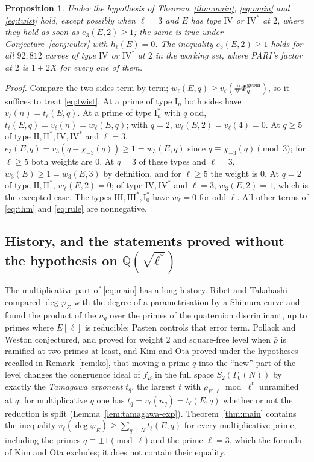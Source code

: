\documentclass[11pt]{amsart}
\newtheorem{proposition}[theorem]{Proposition}
\theoremstyle{definition}
\newcommand{\Q}{\mathbb{Q}}
\newcommand{\degphi}{\deg\varphi_E}
\newcommand{\Phig}{\Phi^{\mathrm{geom}}}
\begin{document}
\begin{proposition}\label{prop:forms}
Under the hypothesis of Theorem~\ref{thm:main}, \eqref{eq:main} and \eqref{eq:twist} hold, except possibly when $\ell=3$ and $E$ has type $\mathrm{IV}$ or $\mathrm{IV}^*$ at $2$, where they hold as soon as $e_3(E,2)\ge1$; the same is true under Conjecture~\ref{conj:euler} with $h_\ell(E)=0$. The inequality $e_3(E,2)\ge1$ holds for all $92{,}812$ curves of type $\mathrm{IV}$ or $\mathrm{IV}^*$ at $2$ in the working set, where PARI's factor at $2$ is $1+2X$ for every one of them.
\end{proposition}
\begin{proof}
Compare the two sides term by term; $w_\ell(E,q)\ge v_\ell(\#\Phig_q)$, so it suffices to treat \eqref{eq:twist}. At a prime of type $\mathrm{I}_n$ both sides have $v_\ell(n)=t_\ell(E,q)$. At a prime of type $\mathrm{I}_n^*$ with $q$ odd, $t_\ell(E,q)=v_\ell(n)=w_\ell(E,q)$; with $q=2$, $w_\ell(E,2)=v_\ell(4)=0$. At $q\ge5$ of type $\mathrm{II},\mathrm{II}^*,\mathrm{IV},\mathrm{IV}^*$ and $\ell=3$, $e_3(E,q)=v_3(q-\chi_{-3}(q))\ge1=w_3(E,q)$ since $q\equiv\chi_{-3}(q)\pmod3$; for $\ell\ge5$ both weights are $0$. At $q=3$ of these types and $\ell=3$, $w_3(E)\ge1=w_3(E,3)$ by definition, and for $\ell\ge5$ the weight is $0$. At $q=2$ of type $\mathrm{II},\mathrm{II}^*$, $w_\ell(E,2)=0$; of type $\mathrm{IV},\mathrm{IV}^*$ and $\ell=3$, $w_3(E,2)=1$, which is the excepted case. The types $\mathrm{III},\mathrm{III}^*,\mathrm{I}_0^*$ have $w_\ell=0$ for odd $\ell$. All other terms of \eqref{eq:thm} and \eqref{eq:rule} are nonnegative.
\end{proof}

\subsection{History, and the statements proved without the hypothesis on \texorpdfstring{$\Q(\sqrt{\ell^*})$}{Q(sqrt l*)}}
The multiplicative part of \eqref{eq:main} has a long history. Ribet and Takahashi \cite{RibetTakahashi97,Takahashi01} compared $\degphi$ with the degree of a parametrisation by a Shimura curve and found the product of the $n_q$ over the primes of the quaternion discriminant, up to primes where $E[\ell]$ is reducible; Pasten \cite{Pasten} controls that error term. Pollack and Weston \cite{PollackWeston11} conjectured, and proved for weight $2$ and square-free level when $\bar\rho$ is ramified at two primes at least, and Kim and Ota \cite{KimOta} proved under the hypotheses recalled in Remark~\ref{rem:ko}, that moving a prime $q$ into the ``new'' part of the level changes the congruence ideal of $f_E$ in the full space $S_2(\Gamma_0(N))$ by exactly the \emph{Tamagawa exponent} $t_q$, the largest $t$ with $\rho_{E,\ell}\bmod\ell^t$ unramified at $q$; for multiplicative $q$ one has $t_q=v_\ell(n_q)=t_\ell(E,q)$ whether or not the reduction is split (Lemma~\ref{lem:tamagawa-exp}). Theorem~\ref{thm:main} contains the inequality $v_\ell(\degphi)\ge\sum_{q\,\|\,N}t_\ell(E,q)$ for every multiplicative prime, including the primes $q\equiv\pm1\pmod\ell$ and the prime $\ell=3$, which the formula of Kim and Ota excludes; it does not contain their equality.
\end{document}
